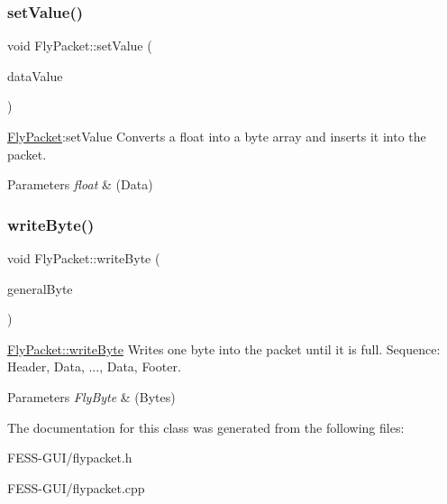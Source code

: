 \subsubsection{\texorpdfstring{set\+Value()}{setValue()}\hspace{0.1cm}{\footnotesize\ttfamily [2/2]}}
{\footnotesize\ttfamily void Fly\+Packet\+::set\+Value (\begin{DoxyParamCaption}\item[{float}]{data\+Value }\end{DoxyParamCaption})}



\hyperlink{class_fly_packet}{Fly\+Packet}\+:set\+Value Converts a float into a byte array and inserts it into the packet. 


\begin{DoxyParams}{Parameters}
{\em float} & (Data) \\
\hline
\end{DoxyParams}
\hypertarget{class_fly_packet_ad0296d3260b26f33eb384dbf5421277a}{}\label{class_fly_packet_ad0296d3260b26f33eb384dbf5421277a} 
\subsubsection{\texorpdfstring{write\+Byte()}{writeByte()}}
{\footnotesize\ttfamily void Fly\+Packet\+::write\+Byte (\begin{DoxyParamCaption}\item[{Fly\+Byte}]{general\+Byte }\end{DoxyParamCaption})}



\hyperlink{class_fly_packet_ad0296d3260b26f33eb384dbf5421277a}{Fly\+Packet\+::write\+Byte} Writes one byte into the packet until it is full. Sequence\+: Header, Data, ..., Data, Footer. 


\begin{DoxyParams}{Parameters}
{\em Fly\+Byte} & (Bytes) \\
\hline
\end{DoxyParams}


The documentation for this class was generated from the following files\+:\begin{DoxyCompactItemize}
\item 
F\+E\+S\+S-\/\+G\+U\+I/flypacket.\+h\item 
F\+E\+S\+S-\/\+G\+U\+I/flypacket.\+cpp\end{DoxyCompactItemize}
